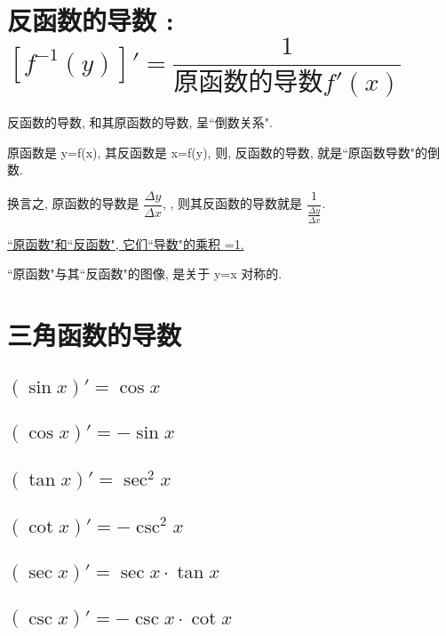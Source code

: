 \documentclass[UTF8]{ctexart}
\begin{document}
\section{反函数的导数 : $\boxed{[f^{-1}(y)]' = \dfrac{1} {\text{原函数的导数} f'(x)}}$}


反函数的导数, 和其原函数的导数, 呈``倒数关系". 

原函数是 y=f(x), 其反函数是 x=f(y), 则, 反函数的导数, 就是``原函数导数"的倒数. 


换言之, 原函数的导数是 $\dfrac{\varDelta y}{\varDelta x} $, , 则其反函数的导数就是  $\dfrac{1}{\frac{\varDelta y}{\varDelta x}}$.

\underline{``原函数"和``反函数", 它们``导数"的乘积 =1.}

``原函数"与其``反函数"的图像, 是关于 y=x 对称的.




\section{三角函数的导数}

\subsection{$(\sin x)' = \cos x$}

\subsection{$(\cos x)' = -\sin x$}

\subsection{$(\tan x)' = \sec^2 x$}

\subsection{$(\cot x)' = -\csc^2 x$}

\subsection{$(\sec x)' = \sec x  \cdot \tan x$}

\subsection{ $(\csc x)' = - \csc x \cdot \cot x$}
\end{document}
